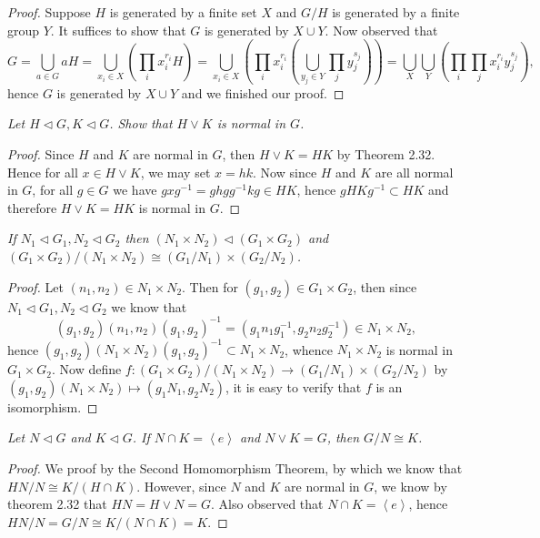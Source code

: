 \begin{proof}
Suppose $H$ is generated by a finite set $X$ and $G/H$ is generated by a finite group $Y$. It suffices to show that $G$ is generated by $X\cup Y$. Now observed that 
$$
G=\bigcup_{a\in G}{aH}=\bigcup_{x_i\in X}{\left( \prod_i{x_{i}^{r_i}H} \right)}=\bigcup_{x_i\in X}{\left( \prod_i{x_{i}^{r_i}\left( \bigcup_{y_j\in Y}{\prod_j{y_{j}^{s_j}}} \right)} \right)}=\bigcup_X{\bigcup_Y{\left( \prod_i{\prod_j{x_{i}^{r_i}y_{j}^{s_j}}} \right)}},
$$
hence $G$ is generated by $X\cup Y$ and we finished our proof.
\end{proof}
\begin{problem}\em
Let $H\lhd G,K\lhd G$. Show that $H\vee K$ is normal in $G$.
\end{problem}
\begin{proof}
Since $H$ and $K$ are normal in $G$, then $H\vee K=HK$ by Theorem 2.32. Hence for all $x\in H\vee K$, we may set $x=hk$. Now since $H$ and $K$ are all normal in $G$, for all $g\in G$ we have $gxg^{-1}=ghgg^{-1}kg\in HK$, hence $gHKg^{-1}\subset HK$ and therefore $H\vee K=HK$ is normal in $G$.
\end{proof}
\begin{problem}\em
If $N_1\lhd G_1,N_2\lhd G_2$ then $(N_1\times N_2)\lhd(G_1\times G_2)$ and $(G_1\times G_2)/(N_1\times N_2)\cong(G_1/N_1)\times(G_2/N_2)$.
\end{problem}
\begin{proof}
Let $(n_1,n_2)\in N_1\times N_2$. Then for $(g_1,g_2)\in G_1\times G_2$, then since $N_1\lhd G_1,N_2\lhd G_2$ we know that 
$$
\left( g_1,g_2 \right) \left( n_1,n_2 \right) \left( g_1,g_2 \right) ^{-1}=\left( g_1n_1g_{1}^{-1},g_2n_2g_{2}^{-1} \right) \in N_1\times N_2,
$$
hence $\left( g_1,g_2 \right) \left( N_1\times N_2 \right) \left( g_1,g_2 \right) ^{-1}\subset N_1\times N_2$, whence $N_1\times N_2$ is normal in $G_1\times G_2$. Now define $f:(G_1\times G_2)/(N_1\times N_2)\to(G_1/N_1)\times(G_2/N_2)$ by $\left( g_1,g_2 \right) \left( N_1\times N_2 \right) \mapsto \left( g_1N_1,g_2N_2 \right) $, it is easy to verify that $f$ is an isomorphism.
\end{proof}
\begin{problem}\em
Let $N\lhd G$ and $K\lhd G$. If $N\cap K=\left<e\right>$ and $N\vee K=G$, then $G/N\cong K$.
\end{problem}
\begin{proof}
We proof by the Second Homomorphism Theorem, by which we know that $HN/N\cong K/(H\cap K)$. However, since $N$ and $K$ are normal in $G$, we know by theorem 2.32 that $HN=H\vee N=G$. Also observed that $N\cap K=\left<e\right>$, hence $HN/N=G/N\cong K/(N\cap K)=K$.
\end{proof}
